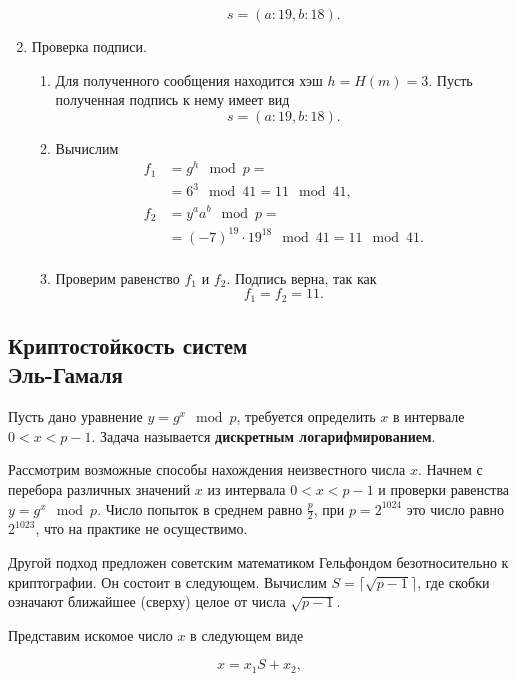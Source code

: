 \begin{enumerate}
\begin{enumerate}
                \[ s = (a:19, b:18). \]
        \end{enumerate}
    \item Проверка подписи.
        \begin{enumerate}
            \item Для полученного сообщения находится хэш $h = H(m) = 3$. Пусть полученная подпись к нему имеет вид
                \[ s = (a:19, b:18). \]
            \item Вычислим
                \[ \begin{array}{ll}
                    f_1 & = g^h \mod p = \\
                        & = 6^3 \mod 41 = 11 \mod 41, \\
                    f_2 & = y^a a^b \mod p = \\
                        & = (-7)^{19} \cdot 19^{18} \mod 41 = 11 \mod 41. \\
                \end{array} \]
            \item Проверим равенство $f_1$ и $f_2$. Подпись верна, так как
                \[ f_1 = f_2 = 11. \]
        \end{enumerate}
\end{enumerate}


\subsection[Криптостойкость]{Криптостойкость систем \protect\\ Эль-Гамаля}

Пусть дано уравнение $y=g^{x} \mod p$, требуется определить $x$ в интервале $0<x<p-1$. Задача называется \textbf{дискретным логарифмированием}.

Рассмотрим возможные способы нахождения неизвестного числа $x$. Начнем с перебора различных значений $x$ из интервала $0<x<p-1$ и проверки равенства $y=g^{x} \mod p$. Число попыток в среднем равно $\frac{p}{2}$, при $p=2^{1024}$ это число равно $2^{1023}$, что на практике не осуществимо.

Другой подход предложен советским математиком Гельфондом безотносительно к криптографии. Он состоит в следующем.
Вычислим $S=\lceil\sqrt{p-1}\rceil $, где скобки означают ближайшее (сверху) целое от числа $\sqrt{p-1} $.

Представим искомое число $x$   в следующем виде

\begin{equation}
    x=x_{1} S+x_{2},
    \label{S}
\end{equation}

